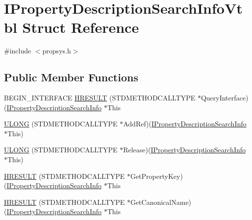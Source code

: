 \hypertarget{struct_i_property_description_search_info_vtbl}{}\section{I\+Property\+Description\+Search\+Info\+Vtbl Struct Reference}
\label{struct_i_property_description_search_info_vtbl}


{\ttfamily \#include $<$propsys.\+h$>$}

\subsection*{Public Member Functions}
\begin{DoxyCompactItemize}
\item 
B\+E\+G\+I\+N\+\_\+\+I\+N\+T\+E\+R\+F\+A\+CE \hyperlink{struct_i_property_description_search_info_vtbl_ac276bcc84a38678a360fd876a5eaad77}{H\+R\+E\+S\+U\+LT} (S\+T\+D\+M\+E\+T\+H\+O\+D\+C\+A\+L\+L\+T\+Y\+PE $\ast$Query\+Interface)(\hyperlink{propsys_8h_af859793a501f0bcd88d72a4382caa467}{I\+Property\+Description\+Search\+Info} $\ast$This
\item 
\hyperlink{struct_i_property_description_search_info_vtbl_a99de0d69f49319df1b7e4beaf6a8179d}{U\+L\+O\+NG} (S\+T\+D\+M\+E\+T\+H\+O\+D\+C\+A\+L\+L\+T\+Y\+PE $\ast$Add\+Ref)(\hyperlink{propsys_8h_af859793a501f0bcd88d72a4382caa467}{I\+Property\+Description\+Search\+Info} $\ast$This)
\item 
\hyperlink{struct_i_property_description_search_info_vtbl_af7e67bfd5187052b69ef24fba7d92c8d}{U\+L\+O\+NG} (S\+T\+D\+M\+E\+T\+H\+O\+D\+C\+A\+L\+L\+T\+Y\+PE $\ast$Release)(\hyperlink{propsys_8h_af859793a501f0bcd88d72a4382caa467}{I\+Property\+Description\+Search\+Info} $\ast$This)
\item 
\hyperlink{struct_i_property_description_search_info_vtbl_aed0736a869a8c6bb536df7c0635d6899}{H\+R\+E\+S\+U\+LT} (S\+T\+D\+M\+E\+T\+H\+O\+D\+C\+A\+L\+L\+T\+Y\+PE $\ast$Get\+Property\+Key)(\hyperlink{propsys_8h_af859793a501f0bcd88d72a4382caa467}{I\+Property\+Description\+Search\+Info} $\ast$This
\item 
\hyperlink{struct_i_property_description_search_info_vtbl_afbcb63f7e2f1ef88684b9c7a0e84b055}{H\+R\+E\+S\+U\+LT} (S\+T\+D\+M\+E\+T\+H\+O\+D\+C\+A\+L\+L\+T\+Y\+PE $\ast$Get\+Canonical\+Name)(\hyperlink{propsys_8h_af859793a501f0bcd88d72a4382caa467}{I\+Property\+Description\+Search\+Info} $\ast$This
\item 

\end{DoxyCompactItemize}
